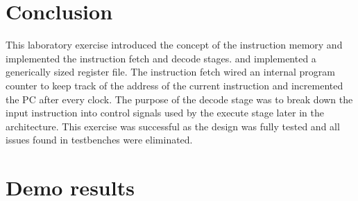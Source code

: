 \documentclass[CMPE]{../KGCOEReport}
\begin{document}
    \section*{Conclusion}
    This laboratory exercise introduced the concept of the instruction
    memory and implemented the instruction fetch and decode stages.
    and implemented a generically sized register file.
    The instruction fetch wired an internal program counter to keep track
    of the address of the current instruction and incremented the PC after
    every clock.
    The purpose of the decode stage was to break down the input instruction
    into control signals used by the execute stage later in the architecture.
	This exercise was successful as the design was fully tested and all issues
	found in testbenches were eliminated.

    \pagebreak

    \section*{Demo results}
    
\end{document}
